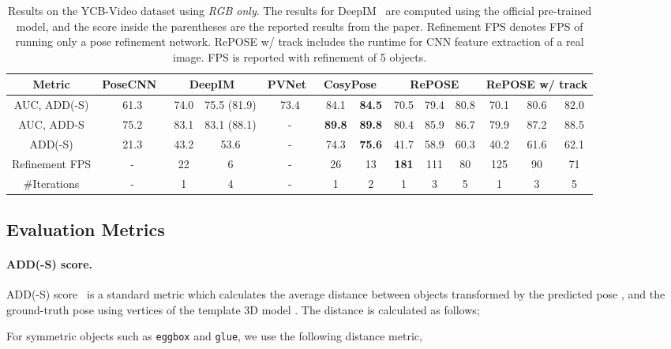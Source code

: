 \documentclass[10pt,twocolumn,letterpaper]{article}
\begin{document}
\begin{table*}[t]
\caption{Results on the YCB-Video dataset using \textit{RGB only}. The results for DeepIM~\cite{li2018deepim} are computed using the official pre-trained model, and the score inside the parentheses are the reported results from the paper. Refinement FPS denotes FPS of running only a pose refinement network. RePOSE w/ track includes the runtime for CNN feature extraction of a real image. FPS is reported with refinement of 5 objects.}
\centering
\scalebox{0.9} {
\begin{tabular}{c||cccccc||ccc|ccc}
\hline
Metric  & PoseCNN~\cite{xiang2018posecnn} & \multicolumn{2}{c}{DeepIM~\cite{li2018deepim}} & PVNet~\cite{peng2019pvnet} & \multicolumn{2}{c}{CosyPose~\cite{labbe2020}} & \multicolumn{3}{c}{RePOSE} & \multicolumn{3}{c}{RePOSE w/ track} \\  \hline
AUC, ADD(-S) & 61.3 & 74.0 & 75.5 (81.9) & 73.4 & 84.1 & \textbf{84.5} & 70.5 & 79.4 & 80.8 & 70.1 & 80.6 & 82.0 \\
AUC, ADD-S & 75.2 & 83.1 & 83.1 (88.1) & - & \textbf{89.8} & \textbf{89.8} & 80.4 & 85.9 & 86.7 & 79.9 & 87.2 & 88.5 \\
ADD(-S) & 21.3 & 43.2 & 53.6 & - & 74.3 & \textbf{75.6} & 41.7 & 58.9 & 60.3 & 40.2 & 61.6 & 62.1 \\ \hline
Refinement FPS  & - & 22 & 6 & - & 26 & 13 & \textbf{181} & 111 & 80 & 125 & 90 & 71 \\ \hline
\#Iterations & - & 1 & 4 & - & 1 & 2 & 1 & 3 & 5 & 1 & 3 & 5 \\
\hline
\end{tabular}
}
\label{tab:ycb}
\end{table*}

\subsection{Evaluation Metrics}

\paragraph{ADD(-S) score.}
\label{sec:ADDS}
ADD(-S) score~\cite{linemod,xiang2018posecnn} is a standard metric which calculates the average distance between objects transformed by the predicted pose , and the ground-truth pose  using  vertices  of the template 3D model . The distance is calculated as follows;


For symmetric objects such as \texttt{eggbox} and \texttt{glue}, we use the following distance metric,
\end{document}
